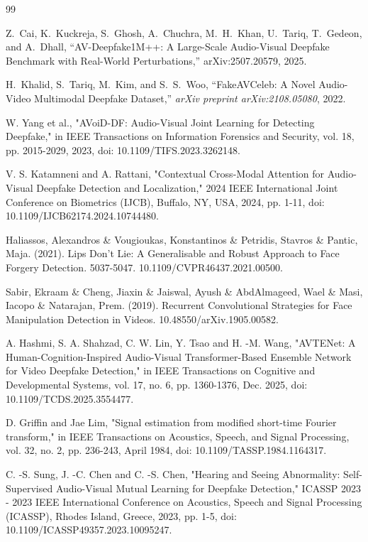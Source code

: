 \documentclass[conference]{IEEEtran}
\begin{document}
\begin{thebibliography}{99}

Z.~Cai, K.~Kuckreja, S.~Ghosh, A.~Chuchra, M.~H.~Khan, U.~Tariq, T.~Gedeon, and A.~Dhall,
``AV-Deepfake1M++: A Large-Scale Audio-Visual Deepfake Benchmark with Real-World Perturbations,''
arXiv:2507.20579, 2025.


H.~Khalid, S.~Tariq, M.~Kim, and S.~S.~Woo,
``FakeAVCeleb: A Novel Audio-Video Multimodal Deepfake Dataset,''
\emph{arXiv preprint arXiv:2108.05080}, 2022.

W. Yang et al., "AVoiD-DF: Audio-Visual Joint Learning for Detecting Deepfake," in IEEE Transactions on Information Forensics and Security, vol. 18, pp. 2015-2029, 2023, doi: 10.1109/TIFS.2023.3262148. 

V. S. Katamneni and A. Rattani, "Contextual Cross-Modal Attention for Audio-Visual Deepfake Detection and Localization," 2024 IEEE International Joint Conference on Biometrics (IJCB), Buffalo, NY, USA, 2024, pp. 1-11, doi: 10.1109/IJCB62174.2024.10744480.

Haliassos, Alexandros \& Vougioukas, Konstantinos \& Petridis, Stavros \& Pantic, Maja. (2021). Lips Don't Lie: A Generalisable and Robust Approach to Face Forgery Detection. 5037-5047. 10.1109/CVPR46437.2021.00500. 

Sabir, Ekraam \& Cheng, Jiaxin \& Jaiswal, Ayush \& AbdAlmageed, Wael \& Masi, Iacopo \& Natarajan, Prem. (2019). Recurrent Convolutional Strategies for Face Manipulation Detection in Videos. 10.48550/arXiv.1905.00582. 

A. Hashmi, S. A. Shahzad, C. W. Lin, Y. Tsao and H. -M. Wang, "AVTENet: A Human-Cognition-Inspired Audio-Visual Transformer-Based Ensemble Network for Video Deepfake Detection," in IEEE Transactions on Cognitive and Developmental Systems, vol. 17, no. 6, pp. 1360-1376, Dec. 2025, doi: 10.1109/TCDS.2025.3554477. 

D. Griffin and Jae Lim, "Signal estimation from modified short-time Fourier transform," in IEEE Transactions on Acoustics, Speech, and Signal Processing, vol. 32, no. 2, pp. 236-243, April 1984, doi: 10.1109/TASSP.1984.1164317.

C. -S. Sung, J. -C. Chen and C. -S. Chen, "Hearing and Seeing Abnormality: Self-Supervised Audio-Visual Mutual Learning for Deepfake Detection," ICASSP 2023 - 2023 IEEE International Conference on Acoustics, Speech and Signal Processing (ICASSP), Rhodes Island, Greece, 2023, pp. 1-5, doi: 10.1109/ICASSP49357.2023.10095247.


\end{thebibliography}
\end{document}
